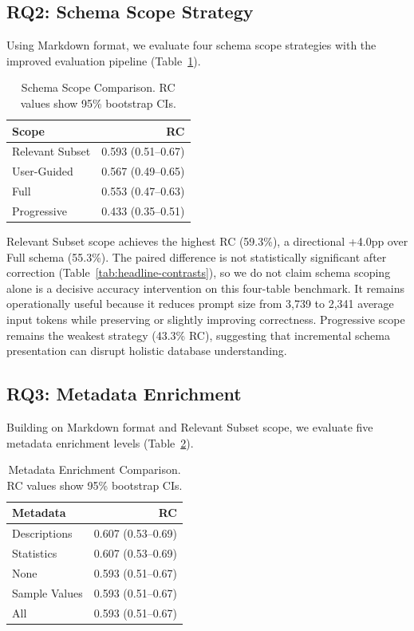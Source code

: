 \documentclass[sigconf, nonacm]{acmart}
\begin{document}
\subsection{RQ2: Schema Scope Strategy}

Using Markdown format, we evaluate four schema scope strategies with the improved evaluation pipeline (Table~\ref{tab:scope}).

\begin{table}[t]
\caption{Schema Scope Comparison. RC values show 95\% bootstrap CIs.}
\label{tab:scope}
\centering
\small
\begin{tabular}{lr}
\toprule
\textbf{Scope} & \textbf{RC} \\
\midrule
Relevant Subset & 0.593 (0.51--0.67) \\
User-Guided & 0.567 (0.49--0.65) \\
Full & 0.553 (0.47--0.63) \\
Progressive & 0.433 (0.35--0.51) \\
\bottomrule
\end{tabular}
\end{table}

Relevant Subset scope achieves the highest RC (59.3\%), a directional +4.0pp over Full schema (55.3\%). The paired difference is not statistically significant after correction (Table~\ref{tab:headline-contrasts}), so we do not claim schema scoping alone is a decisive accuracy intervention on this four-table benchmark. It remains operationally useful because it reduces prompt size from 3,739 to 2,341 average input tokens while preserving or slightly improving correctness. Progressive scope remains the weakest strategy (43.3\% RC), suggesting that incremental schema presentation can disrupt holistic database understanding.

\subsection{RQ3: Metadata Enrichment}

Building on Markdown format and Relevant Subset scope, we evaluate five metadata enrichment levels (Table~\ref{tab:metadata}).

\begin{table}[t]
\caption{Metadata Enrichment Comparison. RC values show 95\% bootstrap CIs.}
\label{tab:metadata}
\centering
\small
\begin{tabular}{lr}
\toprule
\textbf{Metadata} & \textbf{RC} \\
\midrule
Descriptions & 0.607 (0.53--0.69) \\
Statistics & 0.607 (0.53--0.69) \\
None & 0.593 (0.51--0.67) \\
Sample Values & 0.593 (0.51--0.67) \\
All & 0.593 (0.51--0.67) \\
\bottomrule
\end{tabular}
\end{table}
\end{document}
